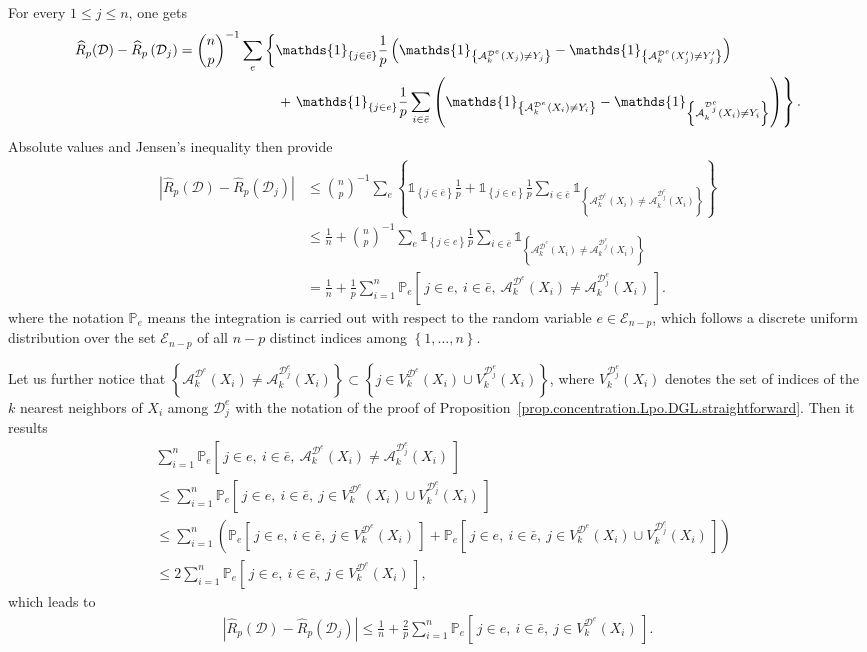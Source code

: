 \documentclass[twoside,11pt]{article}
\numberwithin{equation}{section}
\newcommand{\gp}[1]{\left(#1\right)}
\newcommand{\ga}[1]{\left\{#1\right\}}
\newcommand{\1}{\mathds{1}}%
\newcommand{\ind}[1]{\1_{\ga{#1}}}%
\newcommand{\paren}[1]{\left( #1 \right)}
\newcommand{\croch}[1]{\left[\, #1 \,\right]}
\newcommand{\acc}[1]{\left\{ #1 \right\}}
\newcommand{\abs}[1]{\left\lvert #1 \right\rvert} %
\renewcommand{\P}{\mathbb{P}}
\newcommand{\Rh}{\widehat{R}}
\newcommand{\Rhp}{\Rh_p}
\newcommand{\D}{\mathcal{D}}
\newcommand{\A}{\mathcal{A}}
\newcommand{\Enp}{\mathcal{E}_{n-p}}
\numberwithin{equation}{section}
\theoremstyle{plain}
\begin{document}
For every $1\leq j \leq n$, one gets
\begin{align*}
\Rh_p( \D )- \Rhp\paren{\D_j} &= {n\choose p}^{-1}\sum_e \left\{ \ind{j\in \bar e} \frac{1}{p}  \gp{\ind{\A_k^{\D^e}(X_j)\neq Y_j}-\ind{\A_k^{\D^e}(X_j^{\prime})\neq Y_j^{\prime}}}\right.\\
& \hspace{2.5cm}+ \left. \ind{j\in e} \frac{1}{p} \sum_{i\in \bar e} \gp{\ind{\A_k^{\D^e}(X_i)\neq Y_i}-\ind{\A_k^{\D_j^e}(X_i)\neq Y_i}} \right\} .
\end{align*}
%
Absolute values and Jensen's inequality then provide
\begin{align*}
\abs{  \Rh_p( \D )- \Rhp\paren{\D_j} }
& \leq  {n\choose p}^{-1}\sum_e \acc{ \ind{j\in \bar e} \frac{1}{p} + \ind{j\in e} \frac{1}{p} \sum_{i\in \bar e} \ind{\A_k^{\D^e}(X_i)\neq \A_k^{\D_j^e}(X_i)} } \\
%
& \leq  \frac{1}{n}+ {n\choose p}^{-1}\sum_e  \ind{j\in e} \frac{1}{p} \sum_{i\in \bar e} \ind{\A_k^{\D^e}(X_i)\neq \A_k^{\D_j^e}(X_i)}  \\
%
& =  \frac{1}{n}+ \frac{1}{p} \sum_{i=1}^n \P_e\croch{j\in e,\ i\in \bar e,\ \A_k^{\D^e}(X_i)\neq \A_k^{\D_j^e}(X_i)} .
\end{align*}
%
where the notation $\P_e$ means the integration is carried out with respect to the random variable $e \in \Enp$, which follows a discrete uniform distribution over the set $\Enp$ of all $n-p$ distinct indices among $\acc{1,\ldots,n}$.

Let us further notice that $\acc{ \A_k^{\D^e}(X_i)\neq \A_k^{\D_j^e}(X_i)} \subset \acc{j \in V_k^{\D^e}(X_i)\cup V_k^{\D_j^e}(X_i) } $, where $V_k^{\D_j^e}(X_i)$ denotes the set of indices of the $k$ nearest neighbors of $X_i$ among $\D_j^e$ with the notation of the proof of Proposition~\ref{prop.concentration.Lpo.DGL.straightforward}.
%
Then it results
\begin{align*}
& \sum_{i=1}^n \P_e\croch{j\in e,\ i\in \bar e,\ \A_k^{\D^e}(X_i)\neq \A_k^{\D_j^e}(X_i)} \\
%
& \leq \sum_{i=1}^n \P_e\croch{j\in e,\ i\in \bar e,\ j \in V_k^{\D^e}(X_i)\cup V_k^{\D_j^e}(X_i) } \\
%
& \leq \sum_{i=1}^n \paren{ \P_e\croch{j\in e,\ i\in \bar e,\ j \in  V_k^{\D^e}(X_i) } + \P_e\croch{j\in e,\ i\in \bar e,\ j \in V_k^{\D^e}(X_i)\cup V_k^{\D_j^e}(X_i) } } \\
%
& \leq 2 \sum_{i=1}^n  \P_e\croch{j\in e,\ i\in \bar e,\ j \in  V_k^{\D^e}(X_i) } ,
\end{align*}
%
which leads to
\begin{align*}
\abs{  \Rh_p( \D )- \Rhp\paren{\D_j} }
 \leq  \frac{1}{n}+ \frac{2}{p} \sum_{i=1}^n  \P_e\croch{j\in e,\ i\in \bar e,\ j \in  V_k^{\D^e}(X_i) }  .
\end{align*}
\end{document}
